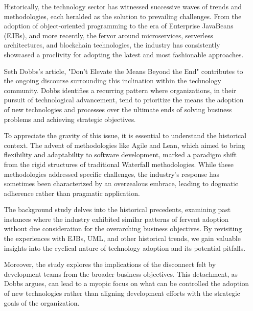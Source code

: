 \documentclass[a4Paper]{article}
\begin{document}
Historically, the technology sector has witnessed successive waves of trends and methodologies, each heralded as the solution to prevailing challenges. From the adoption of object-oriented programming to the era of Enterprise JavaBeans (EJBs), and more recently, the fervor around microservices, serverless architectures, and blockchain technologies, the industry has consistently showcased a proclivity for adopting the latest and most fashionable approaches.

Seth Dobbs's article, "Don't Elevate the Means Beyond the End" contributes to the ongoing discourse surrounding this inclination within the technology community. Dobbs identifies a recurring pattern where organizations, in their pursuit of technological advancement, tend to prioritize the means the adoption of new technologies and processes over the ultimate ends of solving business problems and achieving strategic objectives.

To appreciate the gravity of this issue, it is essential to understand the historical context. The advent of methodologies like Agile and Lean, which aimed to bring flexibility and adaptability to software development, marked a paradigm shift from the rigid structures of traditional Waterfall methodologies. While these methodologies addressed specific challenges, the industry's response has sometimes been characterized by an overzealous embrace, leading to dogmatic adherence rather than pragmatic application.

The background study delves into the historical precedents, examining past instances where the industry exhibited similar patterns of fervent adoption without due consideration for the overarching business objectives. By revisiting the experiences with EJBs, UML, and other historical trends, we gain valuable insights into the cyclical nature of technology adoption and its potential pitfalls.

Moreover, the study explores the implications of the disconnect felt by development teams from the broader business objectives. This detachment, as Dobbs argues, can lead to a myopic focus on what can be controlled the adoption of new technologies rather than aligning development efforts with the strategic goals of the organization.
\pagebreak
\end{document}
